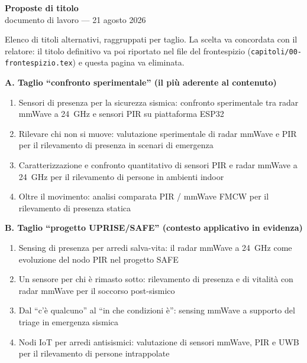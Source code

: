 \thispagestyle{empty}

\begin{center}
{\Large\bfseries Proposte di titolo}\\[2pt]
{\small documento di lavoro --- 21 agosto 2026}
\end{center}

\vspace{0.5em}
\noindent
Elenco di titoli alternativi, raggruppati per taglio. La scelta va concordata con
il relatore: il titolo definitivo va poi riportato nel file del frontespizio
(\texttt{capitoli/}\allowbreak\texttt{00-frontespizio.tex}) e questa pagina va
eliminata.

\vspace{1em}
\noindent\textbf{A. Taglio ``confronto sperimentale'' (il più aderente al contenuto)}
\begin{enumerate}[label=A\arabic*.,leftmargin=2.2em,itemsep=3pt]
  \item Sensori di presenza per la sicurezza sismica: confronto sperimentale tra
        radar mmWave a 24~GHz e sensori PIR su piattaforma ESP32
  \item Rilevare chi non si muove: valutazione sperimentale di radar mmWave e PIR
        per il rilevamento di presenza in scenari di emergenza
  \item Caratterizzazione e confronto quantitativo di sensori PIR e radar mmWave a
        24~GHz per il rilevamento di persone in ambienti indoor
  \item Oltre il movimento: analisi comparata PIR / mmWave FMCW per il rilevamento
        di presenza statica
\end{enumerate}

\vspace{0.6em}
\noindent\textbf{B. Taglio ``progetto UPRISE/SAFE'' (contesto applicativo in evidenza)}
\begin{enumerate}[label=B\arabic*.,leftmargin=2.2em,itemsep=3pt]
  \item Sensing di presenza per arredi salva-vita: il radar mmWave a 24~GHz come
        evoluzione del nodo PIR nel progetto SAFE
  \item Un sensore per chi è rimasto sotto: rilevamento di presenza e di vitalità
        con radar mmWave per il soccorso post-sismico
  \item Dal ``c'è qualcuno'' al ``in che condizioni è'': sensing mmWave a supporto
        del triage in emergenza sismica
  \item Nodi IoT per arredi antisismici: valutazione di sensori mmWave, PIR e UWB
        per il rilevamento di persone intrappolate
\end{enumerate}

